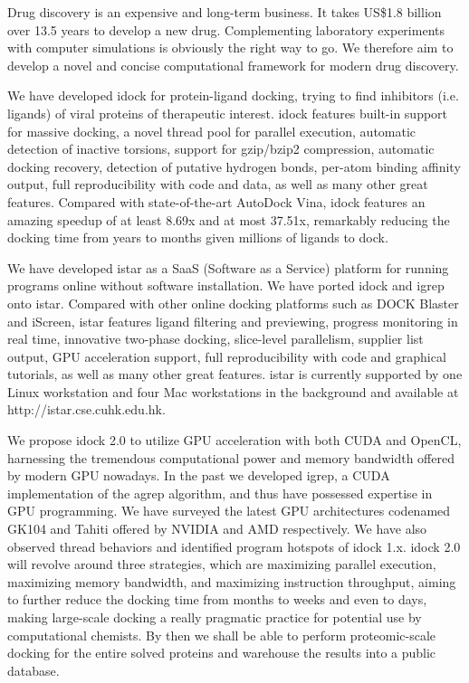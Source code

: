 Drug discovery is an expensive and long-term business. It takes US\$1.8 billion over 13.5 years to develop a new drug. Complementing laboratory experiments with computer simulations is obviously the right way to go. We therefore aim to develop a novel and concise computational framework for modern drug discovery.

We have developed idock for protein-ligand docking, trying to find inhibitors (i.e. ligands) of viral proteins of therapeutic interest. idock features built-in support for massive docking, a novel thread pool for parallel execution, automatic detection of inactive torsions, support for gzip/bzip2 compression, automatic docking recovery, detection of putative hydrogen bonds, per-atom binding affinity output, full reproducibility with code and data, as well as many other great features. Compared with state-of-the-art AutoDock Vina, idock features an amazing speedup of at least 8.69x and at most 37.51x, remarkably reducing the docking time from years to months given millions of ligands to dock.

We have developed istar as a SaaS (Software as a Service) platform for running programs online without software installation. We have ported idock and igrep onto istar. Compared with other online docking platforms such as DOCK Blaster and iScreen, istar features ligand filtering and previewing, progress monitoring in real time, innovative two-phase docking, slice-level parallelism, supplier list output, GPU acceleration support, full reproducibility with code and graphical tutorials, as well as many other great features. istar is currently supported by one Linux workstation and four Mac workstations in the background and available at http://istar.cse.cuhk.edu.hk.

We propose idock 2.0 to utilize GPU acceleration with both CUDA and OpenCL, harnessing the tremendous computational power and memory bandwidth offered by modern GPU nowadays. In the past we developed igrep, a CUDA implementation of the agrep algorithm, and thus have possessed expertise in GPU programming. We have surveyed the latest GPU architectures codenamed GK104 and Tahiti offered by NVIDIA and AMD respectively. We have also observed thread behaviors and identified program hotspots of idock 1.x. idock 2.0 will revolve around three strategies, which are maximizing parallel execution, maximizing memory bandwidth, and maximizing instruction throughput, aiming to further reduce the docking time from months to weeks and even to days, making large-scale docking a really pragmatic practice for potential use by computational chemists. By then we shall be able to perform proteomic-scale docking for the entire solved proteins and warehouse the results into a public database.

